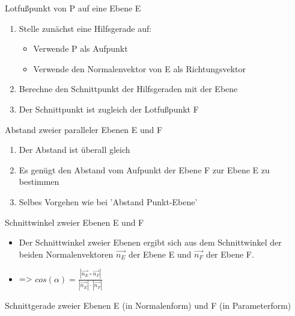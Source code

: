 \documentclass[paper=a6,landscape,ngerman,twoside=true,fontsize=12pt]{scrartcl}
\begin{document}
\begin{frage}
	Lotfußpunkt von P auf eine Ebene E
	
\end{frage}
\begin{antwort}
	\Large	
	\begin{enumerate} 
		\item Stelle zunächst eine Hilfsgerade auf:
		\begin{itemize} 
			\item Verwende P als Aufpunkt
			\item Verwende den Normalenvektor von E als Richtungsvektor
		\end{itemize} 		  
		\item Berechne den Schnittpunkt der Hilfsgeraden mit der Ebene
		\item Der Schnittpunkt ist zugleich der Lotfußpunkt F
	\end{enumerate} 	
\end{antwort}
\begin{frage}
	Abstand zweier paralleler Ebenen E und F
	
\end{frage}
\begin{antwort} 
	\begin{enumerate} 
		\item Der Abstand ist überall gleich
		\item Es genügt den Abstand vom Aufpunkt der Ebene F zur Ebene E zu bestimmen
		\item Selbes Vorgehen wie bei 'Abstand Punkt-Ebene'	
	\end{enumerate} 
	
\end{antwort}
\begin{frage}
	Schnittwinkel zweier Ebenen E und F	
	
\end{frage}
\begin{antwort}
	
	\Large	
	\begin{itemize} 
		\item Der Schnittwinkel zweier Ebenen ergibt sich aus dem Schnittwinkel der beiden Normalenvektoren $\vec{n_E}$ der Ebene E und $\vec{n_F}$ der Ebene F.  
		\item => $cos(\alpha)=\frac{|\vec{n_E} \circ \vec{n_F}|}{|\vec{n_E}|\cdot|\vec{n_F}|}$
	\end{itemize} 	
\end{antwort}
\begin{frage}
	Schnittgerade zweier Ebenen E (in Normalenform) und F (in Parameterform)	
	
\end{frage}
\end{document}
